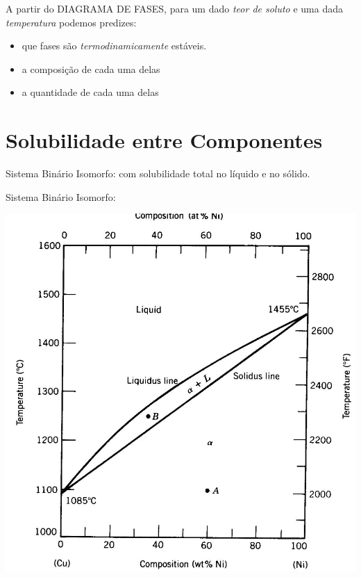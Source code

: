 A partir do DIAGRAMA DE FASES, para um dado \emph{teor de soluto} e uma dada \emph{temperatura} podemos predizes:


\begin{itemize}
	\item que fases são \emph{termodinamicamente} estáveis.
	\item a composição de cada uma delas
	\item a quantidade de cada uma delas
\end{itemize}


\section{Solubilidade entre Componentes}

{\normalsize Sistema Binário Isomorfo: com solubilidade total no líquido e no sólido.}




Sistema Binário Isomorfo:

\includegraphics[scale=0.4,trim={0 0 0 0}]{figures/binIso}


